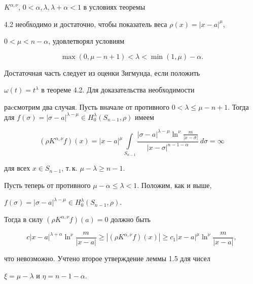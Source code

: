 \begin{pf}
$K^{\alpha,\nu}$, $0 <\alpha, \lambda, \lambda+\alpha< 1$ в условиях теоремы


4.2 необходимо и достаточно, чтобы показатель веса $\rho(x) = |x-a|^\mu$,


$0 < \mu < n-\alpha$, удовлетворял условиям


\begin{equation}


\max (0 ,\mu-n+1 )< \lambda < \min (1 ,\mu )-\alpha.


\end{equation}





Достаточная часть следует из оценки Зигмунда, если положить


$\omega (t)=t^\lambda$ в теореме 4.2. Для доказательства необходимости


раcсмотрим два случая. Пусть вначале от противного $0<\lambda \le \mu-


n+1$. Тогда для $f(\sigma)= |\sigma-a|^{\lambda-\mu} \in H^\lambda_0


(S_{n-1},\rho)$ имеем


$$


(\rho K^{\alpha,\nu} f)(x)=|x-a|^\mu \int\limits_{S_{n-1}}


\frac{|\sigma-a|^{\lambda-\mu}\ln^\nu \frac{m}{|x-\sigma|}}{|x-\sigma|^{n-


1-\alpha}} \, d\sigma=\infty


$$


для всех $x\in S_{n-1}$, т.\,к. $\mu-\lambda\ge n-1$.


Пусть теперь от противного $\mu-\alpha \le\lambda <1$. Положим, как и выше,


$f(\sigma)=|\sigma-a|^{\lambda-\mu} \in H^\lambda_0 (S_{n-1},\rho)$.


Тогда в силу $(\rho K^{\alpha,\nu} f)(a)=0$ должно быть


$$


c|x-a|^{\lambda+\alpha}\ln^\nu \frac{m}{|x-a|}\ge |(\rho K^{\alpha,\nu}


f)(x)|\ge c_1 |x-a|^\mu \ln^\nu \frac{m}{|x-a|},


$$


что невозможно. Учтено второе утверждение леммы 1.5 для чисел


$\xi=\mu-\lambda$ и $\eta=n-1-\alpha$.


\end{pf}






